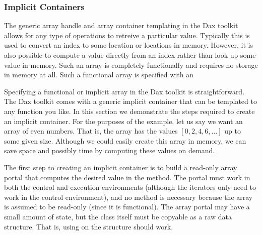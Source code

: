 \subsubsection{Implicit Containers}


The generic array handle and array container templating in the Dax toolkit
allows for any type of operations to retreive a particular value. Typically
this is used to convert an index to some location or locations in
memory. However, it is also possible to compute a value directly from an
index rather than look up some value in memory. Such an array is completely
functionally and requires no storage in memory at all. Such a functional
array is specified with an 

Specifying a functional or implicit array in the Dax toolkit is
straightforward. The Dax toolkit comes with a generic implicit container
that can be templated to any function you like. In this section we
demonstrate the steps required to create an implicit container. For the
purposes of the example, let us say we want an array of even numbers. That
is, the array has the values $[0,2,4,6,\ldots]$ up to some given
size. Although we could easily create this array in memory, we can save
space and possibly time by computing these values on demand.

The first step to creating an implicit container is to build a read-only
array portal that computes the desired value in the 
method. The portal must work in both the control and execution environments
(although the iterators only need to work in the control environment), and
no  method is necessary because the array is assumed to be
read-only (since it is functional). The array portal may have a small
amount of state, but the class itself must be copyable as a raw data
structure. That is, using  on the structure should work.

